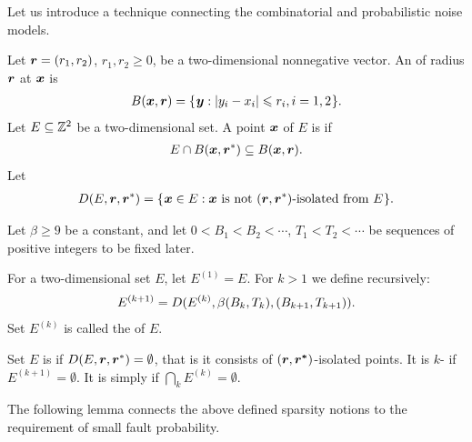 \documentclass[12pt]{memoir}
\def\B{B}
\newcommand{\Tu}{T}
\begin{document}
Let us introduce a technique connecting the combinatorial and probabilistic
noise models.

\begin{definition}
Let \( \boldsymbol{r}=(r_1,r_2) \), \( r_1, r_2\ge 0 \),
be a two-dimensional nonnegative vector.
An  of radius \( \boldsymbol{r} \)  at \( \boldsymbol{x} \) is
\begin{align}\label{eq:ball1}
  B(\boldsymbol{x},\boldsymbol{r}) = \mathopen\{\mskip 1mu\boldsymbol{y} : |y_i - x_i| \leqslant r_i, i=1,2\mskip 1mu\mathclose\}.
\end{align}  
Let \( E\subseteq \mathbb{Z}^{2} \) be a two-dimensional set.
A point \( \boldsymbol{x} \) of \( E \) is  if
\begin{align*}
  E \cap B(\boldsymbol{x},\boldsymbol{r}^*)\subseteq B(\boldsymbol{x}, \boldsymbol{r}).
 \end{align*}
  Let
\begin{align}
  D(E,\boldsymbol{r}, \boldsymbol{r}^*) =
     \mathopen\{\mskip 1mu\boldsymbol{x}\in E : \boldsymbol{x} \text{\rmfamily\mdseries\upshape{ is not }} (\boldsymbol{r}, \boldsymbol{r}^*)\text{\rmfamily\mdseries\upshape{-isolated
  from }} E\mskip 1mu\mathclose\}.
\end{align}
\end{definition}

\begin{definition}[Sparsity]
Let \( \beta\ge 9 \) be a constant, and let 
\( 0<\B_{1}<\B_{2}<\dotsm \), \( \Tu_{1}<\Tu_{2}<\dotsm \) be 
sequences of positive integers to be fixed later.

For a two-dimensional set \( E \), let \( E^{(1)} = E \).
For \( k>1 \) we define recursively:
\begin{align}\label{eq:noise^k}
    E^{(k+1)} = D(E^{(k)}, \beta\pair{\B_k}{\Tu_{k}}, \pair{\B_{k+1}}{\Tu_{k+1}}).
\end{align}
Set \( E^{(k)} \) is called the  of \( E \).

Set \( E \) is  
if \( D(E, \boldsymbol{r}, \boldsymbol{r}^*)=\emptyset \), that is 
it consists of \( (\boldsymbol{r}, \boldsymbol{r^*}) \)-isolated points.
It is \( k \)- if \( E^{(k+1)}=\emptyset \).
It is simply  if \( \bigcap_{k}E^{(k)}=\emptyset \).
\end{definition}

The following lemma connects the above defined sparsity notions to the requirement
of small fault probability.
\end{document}
